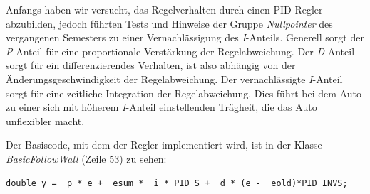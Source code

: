 Anfangs haben wir versucht, das Regelverhalten durch einen PID-Regler abzubilden, jedoch führten Tests und Hinweise der Gruppe \textit{Nullpointer} des vergangenen Semesters zu einer Vernachlässigung des \textit{I}-Anteils. Generell sorgt der \textit{P}-Anteil für eine proportionale Verstärkung der Regelabweichung. Der \textit{D}-Anteil sorgt für ein differenzierendes Verhalten, ist also abhängig von der Änderungsgeschwindigkeit der Regelabweichung.
Der vernachlässigte \textit{I}-Anteil sorgt für eine zeitliche Integration der Regelabweichung. Dies führt bei dem Auto zu einer sich mit höherem \textit{I}-Anteil einstellenden Trägheit, die das Auto unflexibler macht.

Der Basiscode, mit dem der Regler implementiert wird, ist in der Klasse \textit{BasicFollowWall} (Zeile 53) zu sehen:
\begin{lstlisting}
double y = _p * e + _esum * _i * PID_S + _d * (e - _eold)*PID_INVS;
\end{lstlisting}

